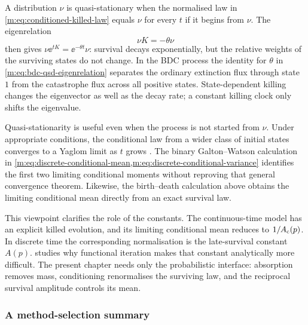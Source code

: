 A distribution $\nu$ is quasi-stationary when the normalised law in
\cref{m:eq:conditioned-killed-law} equals $\nu$ for every $t$ if it begins from
$\nu$.  The eigenrelation
\begin{equation}
  \nu K=-\theta\nu
  \label{m:eq:qsd-left-eigenvector}
\end{equation}
then gives
$\nu\ee^{tK}=\ee^{-\theta t}\nu$: survival decays exponentially, but the
relative weights of the surviving states do not change.  In the BDC process the
identity for $\theta$ in \cref{m:eq:bdc-qsd-eigenrelation} separates the ordinary
extinction flux through state $1$ from the catastrophe flux across all positive
states.  State-dependent killing changes the eigenvector as well as the decay
rate; a constant killing clock only shifts the eigenvalue.

Quasi-stationarity is useful even when the process is not started from $\nu$.
Under appropriate conditions, the conditional law from a wider class of initial
states converges to a Yaglom limit as $t$ grows \cite{Yaglom1947,Meleard2012,
Collet2013}.  The binary Galton--Watson calculation in
\cref{m:eq:discrete-conditional-mean,m:eq:discrete-conditional-variance}
identifies the first two limiting conditional moments without reproving that
general convergence theorem.  Likewise, the birth--death calculation above
obtains the limiting conditional mean directly from an exact survival law.

This viewpoint clarifies the role of the constants.  The continuous-time model
has an explicit killed evolution, and its limiting conditional mean reduces to
$1/A_{\mathrm{c}}(p)$.  In discrete time the corresponding normalisation is the late-survival
constant $A(p)$.  \ChA{} studies why functional iteration makes that constant
analytically more difficult.  The present chapter needs only the probabilistic
interface: absorption removes mass, conditioning renormalises the surviving law,
and the reciprocal survival amplitude controls its mean.

\subsubsection*{A method-selection summary}


